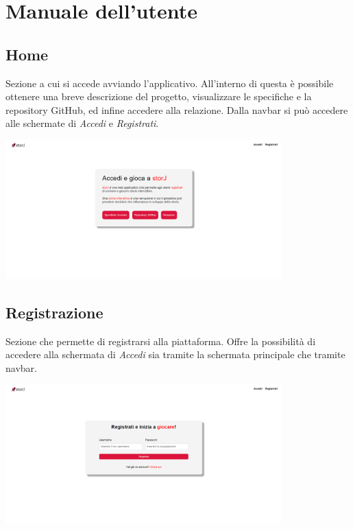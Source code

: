 \documentclass{article}
\begin{document}
\newpage
\section{Manuale dell'utente}
\subsection*{Home}
Sezione a cui si accede avviando l'applicativo. All'interno di questa è possibile ottenere una breve descrizione del progetto, visualizzare le specifiche e la repository GitHub, ed infine accedere alla relazione. Dalla navbar si può accedere alle schermate di \textit{Accedi} e \textit{Registrati}.
\begin{center}
    \includegraphics[width=0.8\textwidth]{foto4.png}
\end{center}

\subsection*{Registrazione}
Sezione che permette di registrarsi alla piattaforma. Offre la possibilità di accedere alla schermata di \textit{Accedi} sia tramite la schermata principale che tramite navbar.
\begin{center}
    \includegraphics[width=0.8\textwidth]{foto5.png}
\end{center}
\end{document}
